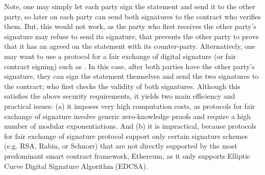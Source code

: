  Note, one may simply let each party  sign the statement and send it to the other party, so later on each party can send both signatures to the contract who verifies them. But, this would not work,  as the party who first receives the other party's signature  may refuse  to send its  signature, that prevents the other party to prove that it has an agreed on the statement with its counter-party. Alternatively, one may want to use a protocol for a fair exchange of digital signature (or fair contract signing) such as \cite{BonehN00,DBLP:conf/fc/GarayJ02}. In this case, after both parties have the other party's signature, they can sign the statement themselves and send the two signatures to the contract; who first checks the validity of both  signatures. Although this satisfies the above security requirements, it yields two main efficiency and practical issues: (a) it imposes very high computation costs, as  protocols for fair exchange of signature involve generic zero-knowledge proofs and require a high number of modular exponentiations. And (b) it is impractical, because protocols for fair exchange of signature protocol support only certain signature schemes (e.g. RSA, Rabin, or Schnorr) that are not directly supported by the most predominant  smart contract framework,  Ethereum, as it only supports  Elliptic Curve Digital Signature Algorithm (EDCSA).







